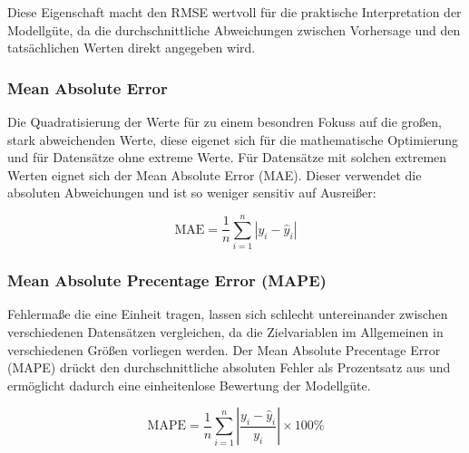 Diese Eigenschaft macht den RMSE wertvoll für die praktische Interpretation der Modellgüte, da die durchschnittliche Abweichungen zwischen Vorhersage und den tatsächlichen Werten direkt angegeben wird. 

\subsubsection{Mean Absolute Error}
Die Quadratisierung der Werte für zu einem besondren Fokuss auf die großen, stark abweichenden Werte, diese eigenet sich für die mathematische Optimierung und für Datensätze ohne extreme Werte. Für Datensätze mit solchen extremen Werten eignet sich der Mean Absolute Error (MAE). Dieser verwendet die absoluten Abweichungen und ist so weniger sensitiv auf Ausreißer:

\begin{equation}
  \text{MAE} = \frac{1}{n} \sum_{i=1}^{n} |y_i - \hat{y}_i|
  \label{eq:mae}
\end{equation}

\subsubsection{Mean Absolute Precentage Error (MAPE)}

Fehlermaße die eine Einheit tragen, lassen sich schlecht untereinander zwischen verschiedenen Datensätzen vergleichen, da die Zielvariablen im Allgemeinen in verschiedenen Größen vorliegen werden. Der Mean Absolute Precentage Error (MAPE) drückt den durchschnittliche absoluten Fehler als Prozentsatz aus und ermöglicht dadurch eine einheitenlose Bewertung der Modellgüte.

\begin{equation}
\text{MAPE} = \frac{1}{n} \sum_{i=1}^{n} \left|\frac{y_i - \hat{y}_i}{y_i}\right| \times 100\%
\label{eq:mape}
\end{equation}

